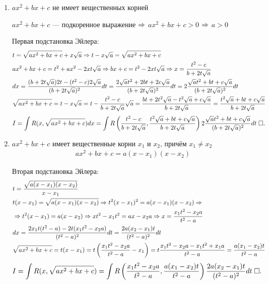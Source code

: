 \documentclass{article}
\begin{document}
\proof
\begin{enumerate}
	\item{}$ax^{2}+bx+c$ не имеет вещественных корней

	$ax^{2}+bx+c$ --- подкоренное выражение $\Rarr$ $ax^{2}+bx+c>0$ $\Rarr$ $a>0$

	Первая подстановка Эйлера:
	\begin{align*}
		 & t=\sqrt{ax^{2}+bx+c}+x\sqrt{a}\Rarr t-x\sqrt{a}=\sqrt{ax^{2}+bx+c}                                                                   \\
		 & ax^{2}+bx+c=t^{2}+ax^{2}-2xt\sqrt{a}\Rarr bx+c=t^{2}-2xt\sqrt{a}\Rarr x=\frac{t^{2}-c}{b+2t\sqrt{a}}                                 \\
		 & dx=\frac{(b+2t\sqrt{a})2t-(t^{2}-c)2\sqrt{a}}{(b+2t\sqrt{a})^{2}}dt=\frac{2\sqrt{a}t^{2}+2bt+2c\sqrt{a}}{(b+2t\sqrt{a})^{2}}dt
		=2\frac{\sqrt{a}t^{2}+bt+c\sqrt{a}}{(b+2t\sqrt{a})^{2}}dt                                                                               \\
		 & \sqrt{ax^{2}+bx+c}=t-x\sqrt{a}=t-\frac{t^{2}-c}{b+2t\sqrt{a}}\sqrt{a}=\frac{bt+2t^{2}\sqrt{a}-t^{2}\sqrt{a}+c\sqrt{a}}{b+2t\sqrt{a}}
		=\frac{t^{2}\sqrt{a}+bt+c\sqrt{a}}{b+2t\sqrt{a}}
	\end{align*}
	\begin{align*}
		I=\int R(x,\sqrt{ax^{2}+bx+c})dx=\int R\left(\frac{t^{2}-c}{b+2t\sqrt{a}},\frac{t^{2}\sqrt{a}+bt+c\sqrt{a}}{b+2t\sqrt{a}}\right)2\frac{\sqrt{a}t^{2}+bt+c\sqrt{a}}{(b+2t\sqrt{a})^{2}}dt\qed
	\end{align*}
	\item{}$ax^{2}+bx+c$ имеет вещественные корни $x_1$ и $x_2$, причём $x_1\neq x_2$
	\begin{align*}
		ax^{2}+bx+c=a(x-x_1)(x-x_2)
	\end{align*}

	Вторая подстановка Эйлера:
	\begin{align*}
		 & t=\frac{\sqrt{a(x-x_1)(x-x_2)}}{x-x_1}                                                           \\
		 & t(x-x_1)=\sqrt{a(x-x_1)(x-x_2)}\Rarr t^{2}(x-x_1)^{2}=a(x-x_1)(x-x_2)\Rarr                       \\
		 & \Rarr t^{2}(x-x_1)=a(x-x_2)\Rarr xt^{2}-x_1t^{2}=ax-x_2a\Rarr x=\frac{x_1t^{2}-x_2a}{t^{2}-a}    \\
		 & dx=\frac{2x_1t(t^{2}-a)-2t(x_1t^{2}-x_2a)}{(t^{2}-a)^{2}}dt=\frac{2a(x_2-x_1)t}{(t^{2}-a)^{2}}dt \\
		 & \sqrt{ax^{2}+bx+c}=t(x-x_1)=t\left(\frac{x_1t^{2}-x_2a}{t^{2}-a}-x_1\right)
		=t\frac{x_1t^{2}-x_2a-x_1t^{2}+x_1a}{t^{2}-a}=\frac{a(x_1-x_2)t}{t^{2}-a}
	\end{align*}
	\begin{align*}
		I=\int R(x,\sqrt{ax^{2}+bx+c})=\int R\left(\frac{x_1t^{2}-x_2a}{t^{2}-a},\frac{a(x_1-x_2)t}{t^{2}-a}\right)\frac{2a(x_2-x_1)t}{(t^{2}-a)^{2}}dt\qed
	\end{align*}
\end{enumerate}
\end{document}
